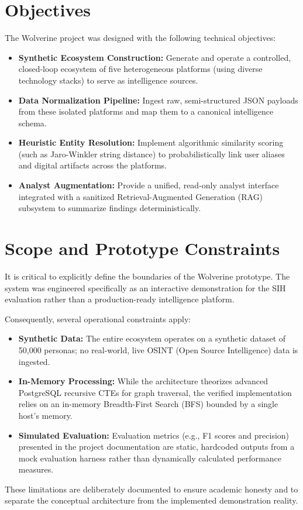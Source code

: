 \section{Objectives}
\label{sec:intro-objectives}
The Wolverine project was designed with the following technical objectives:
\begin{itemize}
    \item \textbf{Synthetic Ecosystem Construction:} Generate and operate a controlled, closed-loop ecosystem of five heterogeneous platforms (using diverse technology stacks) to serve as intelligence sources.
    \item \textbf{Data Normalization Pipeline:} Ingest raw, semi-structured JSON payloads from these isolated platforms and map them to a canonical intelligence schema.
    \item \textbf{Heuristic Entity Resolution:} Implement algorithmic similarity scoring (such as Jaro-Winkler string distance) to probabilistically link user aliases and digital artifacts across the platforms.
    \item \textbf{Analyst Augmentation:} Provide a unified, read-only analyst interface integrated with a sanitized Retrieval-Augmented Generation (RAG) subsystem to summarize findings deterministically.
\end{itemize}

\section{Scope and Prototype Constraints}
\label{sec:intro-scope}
It is critical to explicitly define the boundaries of the Wolverine prototype. The system was engineered specifically as an interactive demonstration for the SIH evaluation rather than a production-ready intelligence platform. 

Consequently, several operational constraints apply:
\begin{itemize}
    \item \textbf{Synthetic Data:} The entire ecosystem operates on a synthetic dataset of 50,000 personas; no real-world, live OSINT (Open Source Intelligence) data is ingested.
    \item \textbf{In-Memory Processing:} While the architecture theorizes advanced PostgreSQL recursive CTEs for graph traversal, the verified implementation relies on an in-memory Breadth-First Search (BFS) bounded by a single host's memory.
    \item \textbf{Simulated Evaluation:} Evaluation metrics (e.g., F1 scores and precision) presented in the project documentation are static, hardcoded outputs from a mock evaluation harness rather than dynamically calculated performance measures.
\end{itemize}
These limitations are deliberately documented to ensure academic honesty and to separate the conceptual architecture from the implemented demonstration reality.

